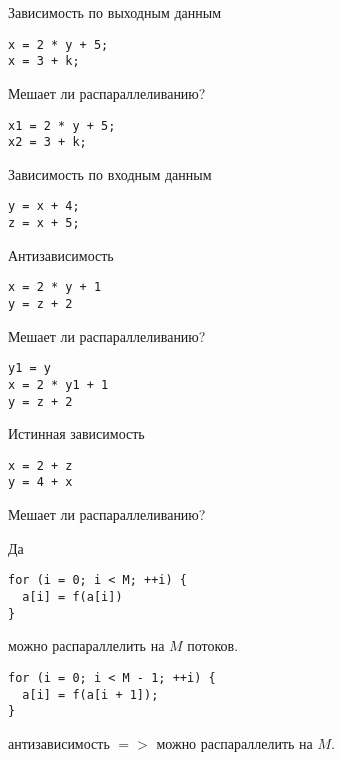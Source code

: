 \begin{frame}[fragile]{Зависимость по выходным данным}
\begin{lstlisting}
x = 2 * y + 5;
x = 3 + k;
\end{lstlisting}

Мешает ли распараллеливанию?

\pause

\begin{lstlisting}
x1 = 2 * y + 5;
x2 = 3 + k;
\end{lstlisting}
\end{frame}

\begin{frame}[fragile]{Зависимость по входным данным}
\begin{lstlisting}
y = x + 4;
z = x + 5;
\end{lstlisting}
\end{frame}

\begin{frame}[fragile]{Антизависимость}
\begin{lstlisting}
x = 2 * y + 1
y = z + 2
\end{lstlisting}

Мешает ли распараллеливанию?

\pause

\begin{lstlisting}
y1 = y
x = 2 * y1 + 1
y = z + 2
\end{lstlisting}
\end{frame}

\begin{frame}[fragile]{Истинная зависимость}
\begin{lstlisting}
x = 2 + z
y = 4 + x
\end{lstlisting}

\pause\bigskip

Мешает ли распараллеливанию?

\pause\bigskip

Да
\end{frame}

\begin{frame}[fragile]

\begin{lstlisting}
for (i = 0; i < M; ++i) {
  a[i] = f(a[i])
}
\end{lstlisting}

можно распараллелить на $M$ потоков.

\end{frame}

\begin{frame}[fragile]

\begin{lstlisting}
for (i = 0; i < M - 1; ++i) {
  a[i] = f(a[i + 1]);
}
\end{lstlisting}

антизависимость $=>$ можно распараллелить на $M$.

\end{frame}

